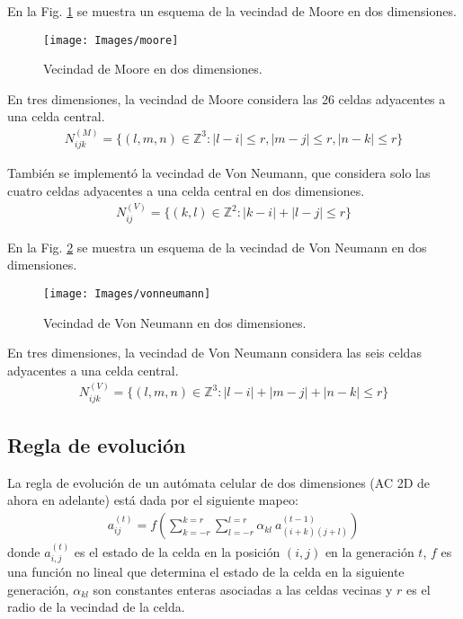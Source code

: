 En la Fig. \ref{fig:moore} se muestra un esquema de la vecindad de Moore en dos dimensiones.
\begin{figure}[H]
    \centering
    \texttt{[image: Images/moore]}
    \caption{Vecindad de Moore en dos dimensiones.}
    \label{fig:moore}
\end{figure}

En tres dimensiones, la vecindad de Moore considera las 26 celdas adyacentes a una celda central.
\begin{equation}
    \label{eq:moore_neighborhood_3d}
    \begin{aligned}
        N^{(M)}_{ijk} = \{(l,m,n) \in \mathbb{Z}^3 : |l-i| \leq r, |m-j| \leq r, |n-k| \leq r\}
    \end{aligned}
\end{equation}

También se implementó la vecindad de Von Neumann, que considera solo las cuatro celdas adyacentes a una celda central en dos dimensiones.
\begin{equation}
    \label{eq:von_neumann_neighborhood}
    \begin{aligned}
        N^{(V)}_{ij} = \{(k,l) \in \mathbb{Z}^2 : |k-i| + |l-j| \leq r\}
    \end{aligned}
\end{equation}

En la Fig. \ref{fig:vonneumann} se muestra un esquema de la vecindad de Von Neumann en dos dimensiones.
\begin{figure}[H]
    \centering
    \texttt{[image: Images/vonneumann]}
    \caption{Vecindad de Von Neumann en dos dimensiones.}
    \label{fig:vonneumann}
\end{figure}

En tres dimensiones, la vecindad de Von Neumann considera las seis celdas adyacentes a una celda central.
\begin{equation}
    \label{eq:von_neumann_neighborhood_3d}
    \begin{aligned}
        N^{(V)}_{ijk} = \{(l,m,n) \in \mathbb{Z}^3 : |l-i| + |m-j| + |n-k| \leq r\}
    \end{aligned}
\end{equation}


\subsection{Regla de evolución}
\label{subsec:evolucion}
La regla de evolución de un autómata celular de dos dimensiones (AC 2D de ahora en adelante) está dada por el siguiente mapeo:
\begin{equation}
    \label{eq:evolution_rule}
    \begin{aligned}
        a_{ij}^{(t)} = f(\sum^{k=r}_{k=-r}\sum^{l=r}_{l=-r}{\alpha_{kl}\ a_{(i+k)(j+l)}^{(t-1)}})
    \end{aligned}
\end{equation}
donde $a_{i,j}^{(t)}$ es el estado de la celda en la posición $(i,j)$ en la generación $t$, $f$ es una función no lineal que determina el estado de la celda en la siguiente generación, $\alpha_{kl}$ son constantes enteras asociadas a las celdas vecinas y $r$ es el radio de la vecindad de la celda.

